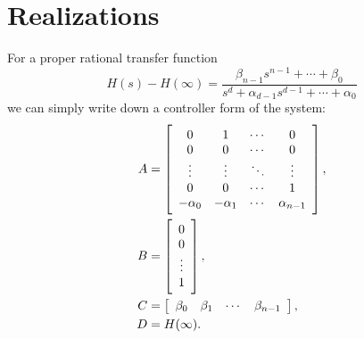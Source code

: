 \documentclass{report}
\begin{document}
\section{Realizations}
For a proper rational transfer function
$$
H(s) - H(\infty)
  = \frac{\beta_{n-1}s^{n-1} + \cdots + \beta_0}
         {s^d + \alpha_{d-1}s^{d-1} + \cdots + \alpha_0}
$$
we can simply write down a controller form of the system:
\begin{align*}
A &=
\left[\begin{array}{c c c c}
  0         & 1         & \cdots & 0      \\
  0         & 0         & \cdots & 0      \\
  \vdots    & \vdots    & \ddots & \vdots \\
  0         & 0         & \cdots & 1      \\
  -\alpha_0 & -\alpha_1 & \cdots & \alpha_{n-1}
\end{array}\right], \\
B &=
\left[\begin{array}{c}
0      \\
0      \\
\vdots \\
1
\end{array}\right], \\
C &=
\left[\begin{array}{c c c c}
  \beta_0 & \beta_1 & \cdots & \beta_{n-1}
\end{array}\right], \\
D &= H(\infty).
\end{align*}
\end{document}
